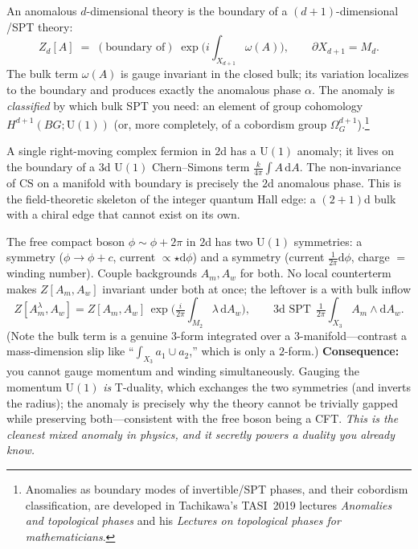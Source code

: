 \documentclass[11pt]{article}
\newcommand{\dd}{\mathrm{d}}                 %
\newcommand{\Uone}{\mathrm{U}(1)}
\begin{document}
\begin{eequation}
An anomalous $d$-dimensional theory is the boundary of a $(d{+}1)$-dimensional
/SPT theory:
\[
Z_{d}[A] \;=\; (\text{boundary of})\;\exp\!\Big(i\!\int_{X_{d+1}}\!\omega(A)\Big),
\qquad \partial X_{d+1}=M_d.
\]
The bulk term $\omega(A)$ is gauge invariant in the closed bulk; its variation localizes
to the boundary and produces exactly the anomalous phase $\alpha$. The anomaly is
\emph{classified} by which bulk SPT you need: an element of group cohomology
$H^{d+1}(BG;\Uone)$ (or, more completely, of a cobordism group
$\Omega^{d+1}_G$).\footnote{Anomalies as boundary modes of invertible/SPT phases, and
their cobordism classification, are developed in Tachikawa's TASI~2019 lectures
\emph{Anomalies and topological phases} and his \emph{Lectures on topological phases for
mathematicians}.}
\end{eequation}

\begin{eexample}
A single right-moving complex fermion in $2$d has a $\Uone$ anomaly; it lives on the
boundary of a $3$d $\Uone$ Chern--Simons term $\frac{k}{4\pi}\int A\,\dd A$. The
non-invariance of $\mathrm{CS}$ on a manifold with boundary is precisely the $2$d
anomalous phase. This is the field-theoretic skeleton of the integer quantum Hall edge:
a $(2{+}1)$d bulk with a chiral edge that cannot exist on its own.
\end{eexample}

\begin{eexample}
The free compact boson $\phi\sim\phi+2\pi$ in $2$d has two $\Uone$ symmetries: a
 symmetry ($\phi\to\phi+c$, current $\propto\star\dd\phi$) and a
 symmetry (current $\frac{1}{2\pi}\dd\phi$, charge $=$ winding number).
Couple backgrounds $A_m,A_w$ for both. No local counterterm makes $Z[A_m,A_w]$ invariant
under both at once; the leftover is a  with bulk inflow
\[
\textstyle Z[A_m^{\lambda},A_w] = Z[A_m,A_w]\,
\exp\!\big(\tfrac{i}{2\pi}\!\int_{M_2}\lambda\,\dd A_w\big),
\qquad \text{$3$d SPT}\ \ \tfrac{1}{2\pi}\!\int_{X_3} A_m\wedge \dd A_w .
\]
(Note the bulk term is a genuine $3$-form integrated over a $3$-manifold---contrast a
mass-dimension slip like ``$\int_{X_3} a_1\cup a_2$,'' which is only a $2$-form.)
\textbf{Consequence:} you cannot gauge momentum and winding simultaneously. Gauging the
momentum $\Uone$ \emph{is} T-duality, which exchanges the two symmetries (and inverts the
radius); the anomaly is precisely why the theory cannot be trivially gapped while
preserving both---consistent with the free boson being a CFT. \emph{This is the cleanest
mixed anomaly in physics, and it secretly powers a duality you already know.}
\end{eexample}
\end{document}
